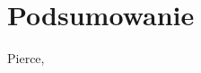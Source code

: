 \documentclass[11pt,leqno]{article}
\begin{document}
\section{Podsumowanie}                       
\setcounter{equation}{0}




\thispagestyle{empty}
\begin{thebibliography}{99}

 Pierce, \textit{} 


	  
\end{thebibliography}
\end{document}
